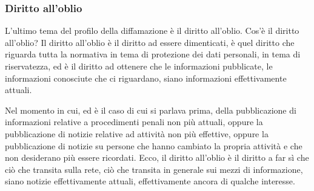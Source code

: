 \subsubsection{Diritto all'oblio}
L'ultimo tema del profilo della diffamazione è il diritto all'oblio. Cos'è il diritto all'oblio? Il diritto all'oblio è il diritto ad essere dimenticati, è quel diritto che riguarda tutta la normativa in tema di protezione dei dati personali, in tema di riservatezza, ed è il diritto ad ottenere che le informazioni pubblicate, le informazioni conosciute che ci riguardano, siano informazioni effettivamente attuali.\par
Nel momento in cui, ed è il caso di cui si parlava prima, della pubblicazione di informazioni relative a procedimenti penali non più attuali, oppure la pubblicazione di notizie relative ad attività non più effettive, oppure la pubblicazione di notizie su persone che hanno cambiato la propria attività e che non desiderano più essere ricordati. Ecco, il diritto all'oblio è il diritto a far sì che ciò che transita sulla rete, ciò che transita in generale sui mezzi di informazione, siano notizie effettivamente attuali, effettivamente ancora di qualche interesse.\par

